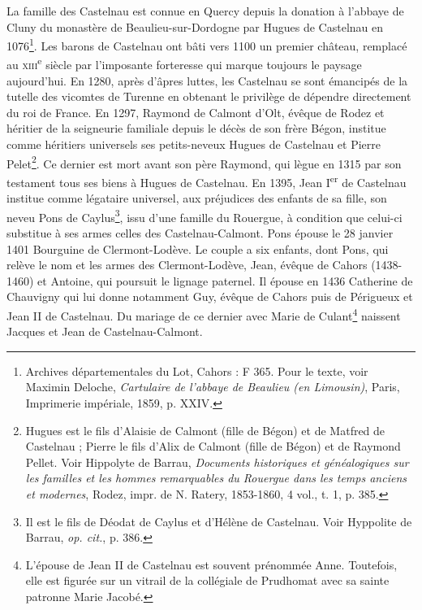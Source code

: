 \documentclass[12pt,twoside,openany]{book}
\begin{document}
La famille des Castelnau est connue en Quercy depuis la donation à l’abbaye de Cluny du monastère de Beaulieu-sur-Dordogne par Hugues de Castelnau en 1076\footnote{Archives départementales du Lot, Cahors : F 365. Pour le texte, voir Maximin Deloche, \textit{Cartulaire de l’abbaye de Beaulieu (en Limousin)}, Paris, Imprimerie impériale, 1859, p. XXIV.}. Les barons de Castelnau ont bâti vers 1100 un premier château, remplacé au \textsc{xiii}\textsuperscript{e} siècle par l’imposante forteresse qui marque toujours le paysage aujourd’hui. En 1280, après d’âpres luttes, les Castelnau se sont émancipés de la tutelle des vicomtes de Turenne en obtenant le privilège de dépendre directement du roi de France. En 1297, Raymond de Calmont d’Olt, évêque de Rodez et héritier de la seigneurie familiale depuis le décès de son frère Bégon, institue comme héritiers universels ses petits-neveux Hugues de Castelnau et Pierre Pelet\footnote{Hugues est le fils d’Alaisie de Calmont (fille de Bégon) et de Matfred de Castelnau ; Pierre le fils d’Alix de Calmont (fille de Bégon) et de Raymond Pellet. Voir Hippolyte de Barrau, \textit{Documents historiques et généalogiques sur les familles et les hommes remarquables du Rouergue dans les temps anciens et modernes}, Rodez, impr. de N. Ratery, 1853-1860, 4 vol., t. 1, p. 385.}. Ce dernier est mort avant son père Raymond, qui lègue en 1315 par son testament tous ses biens à Hugues de Castelnau. En 1395, Jean I\textsuperscript{er} de Castelnau institue comme légataire universel, aux préjudices des enfants de sa fille, son neveu Pons de Caylus\footnote{Il est le fils de Déodat de Caylus et d’Hélène de Castelnau. Voir Hyppolite de Barrau, \textit{op. cit.}, p. 386.}, issu d’une famille du Rouergue, à condition que celui-ci substitue à ses armes celles des Castelnau-Calmont. Pons épouse le 28 janvier 1401 Bourguine de Clermont-Lodève. Le couple a six enfants, dont Pons, qui relève le nom et les armes des Clermont-Lodève, Jean, évêque de Cahors (1438-1460) et Antoine, qui poursuit le lignage paternel. Il épouse en 1436 Catherine de Chauvigny qui lui donne notamment Guy, évêque de Cahors puis de Périgueux et Jean II de Castelnau. Du mariage de ce dernier avec Marie de Culant\footnote{L’épouse de Jean II de Castelnau est souvent prénommée Anne. Toutefois, elle est figurée sur un vitrail de la collégiale de Prudhomat avec sa sainte patronne Marie Jacobé.} naissent Jacques et Jean de Castelnau-Calmont.
\end{document}
